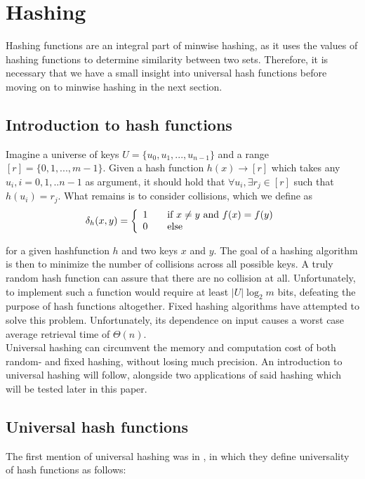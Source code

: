 \documentclass[../../main.tex]{subfiles}
\begin{document}
\section{Hashing}
Hashing functions are an integral part of minwise hashing, as it uses the values of hashing functions to determine similarity between two sets. Therefore, it is necessary that we have a small insight into universal hash functions before moving on to minwise hashing in the next section.

\subsection{Introduction to hash functions}
Imagine a universe of keys $U=\{u_{0},u_{1},...,u_{n-1}\}$ and a range $[r]=\{0,1,...,m-1\}$. Given a hash function $h(x)\rightarrow [r]$ which takes any $u_i,i=0,1,..n-1$ as argument, it should hold that $\forall u_i,\exists r_j \in [r]$ such that $h(u_i)= r_j$. What remains is to consider collisions, which we define as
\begin{equation}\label{collision}
\delta_h(x,y) = \left\{ 
  \begin{array}{l l}
    1 & \quad \text{if $x\neq y$ and $f(x)=f(y)$}\\
    0 & \quad \text{else}
  \end{array} \right.
\end{equation}

for a given hashfunction $h$ and two keys $x$ and $y$. The goal of a hashing algorithm is then to minimize the number of collisions across all possible keys. A truly random hash function can assure that there are no collision at all. Unfortunately, to implement such a function would require at least $|U|\log_2 m$ bits\cite{dikuHash}, defeating the purpose of hash functions altogether. Fixed hashing algorithms have attempted to solve this problem. Unfortunately, its dependence on input causes a worst case average retrieval time of $\Theta(n)$.\cite{introToAlg}\\

Universal hashing can circumvent the memory and computation cost of both random- and fixed hashing, without losing much precision. An introduction to universal hashing will follow, alongside two applications of said hashing which will be tested later in this paper.

\subsection{Universal hash functions}
The first mention of universal hashing was in \cite{carterWegman}, in which they define universality of hash functions as follows:\\
\end{document}

